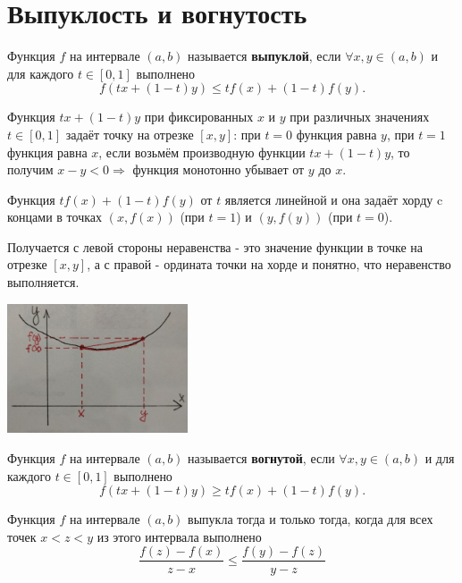 	\section{Выпуклость и вогнутость}
	
	\begin{definition}
		Функция $f$ на интервале $(a, b)$ называется \textbf{выпуклой}, если $\forall x, y \in (a, b)$ и для каждого $t \in [0, 1]$ выполнено
		\[ f(tx + (1 - t)y) \leqslant tf(x) + (1 - t) f(y). \]
	\end{definition}
	
	\begin{explanation}
	    Функция $tx + (1 - t)y$ при фиксированных $x$ и $y$	при различных значениях $t \in [0, 1]$ задаёт точку на отрезке $[x, y]$: при $t = 0$ функция равна $y$, при $t = 1$ функция равна $x$, если возьмём производную функции $tx + (1 - t)y$, то получим $x - y < 0 \Rightarrow$ функция монотонно убывает от $y$ до $x$.
	    
	    Функция $t f(x) + (1 - t) f(y)$ от $t$ является линейной и она задаёт хорду c концами в точках $(x, f(x))$ (при $t = 1$) и $(y, f(y))$ (при $t = 0$). 
	    
	    Получается с левой стороны неравенства - это значение функции в точке на отрезке $[x, y]$, а с правой - ордината точки на хорде и понятно, что неравенство выполняется.
	\end{explanation}
	
	\begin{center}
		\includegraphics[width=0.4\textwidth]{img/lecture21/convex}
	\end{center}
	
	\begin{definition}
		Функция $f$ на интервале $(a, b)$ называется \textbf{вогнутой}, если $\forall x, y \in (a, b)$ и для каждого $t \in [0, 1]$ выполнено
		\[ f(tx + (1 - t)y) \geqslant tf(x) + (1 - t)f(y). \]
	\end{definition}
	
	\begin{lemma}
		Функция $f$ на интервале $(a, b)$ выпукла тогда и только тогда, когда для всех точек $x < z < y$ из этого интервала выполнено
		\[ \frac{f(z) - f(x)}{z - x} \leqslant \frac{f(y) - f(z)}{y - z} \]
	\end{lemma}
	
